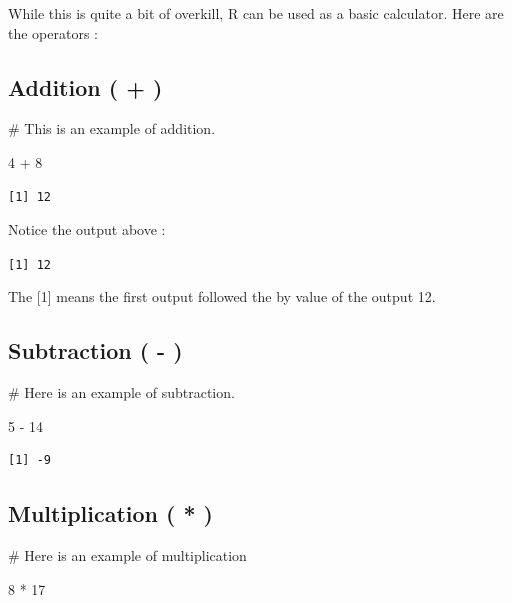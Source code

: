 \documentclass[
  letterpaper,
  DIV=11,
  numbers=noendperiod]{scrreprt}
\newenvironment{Shaded}{\begin{snugshade}}{\end{snugshade}}
\newcommand{\CommentTok}[1]{\textcolor[rgb]{0.37,0.37,0.37}{#1}}
\newcommand{\DecValTok}[1]{\textcolor[rgb]{0.68,0.00,0.00}{#1}}
\newcommand{\SpecialCharTok}[1]{\textcolor[rgb]{0.37,0.37,0.37}{#1}}
\begin{document}

While this is quite a bit of overkill, R can be used as a basic
calculator. Here are the operators :

\subsection*{Addition ( + )}\label{addition}

\begin{Shaded}
\begin{Highlighting}[]
\CommentTok{\# This is an example of addition.}

\DecValTok{4} \SpecialCharTok{+} \DecValTok{8}
\end{Highlighting}
\end{Shaded}

\begin{verbatim}
[1] 12
\end{verbatim}

Notice the output above :

\texttt{{[}1{]}\ 12}

The {[}1{]} means the first output followed the by value of the output
12.

\subsection*{Subtraction ( - )}\label{subtraction--}

\begin{Shaded}
\begin{Highlighting}[]
\CommentTok{\# Here is an example of subtraction.}

\DecValTok{5} \SpecialCharTok{{-}} \DecValTok{14}
\end{Highlighting}
\end{Shaded}

\begin{verbatim}
[1] -9
\end{verbatim}

\subsection*{Multiplication ( * )}\label{multiplication}

\begin{Shaded}
\begin{Highlighting}[]
\CommentTok{\# Here is an example of multiplication}

\DecValTok{8} \SpecialCharTok{*} \DecValTok{17}
\end{Highlighting}
\end{Shaded}
\end{document}
